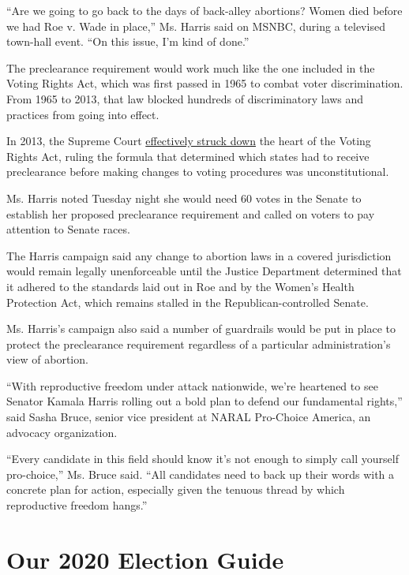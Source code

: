 ``Are we going to go back to the days of back-alley abortions? Women
died before we had Roe v. Wade in place,'' Ms. Harris said on MSNBC,
during a televised town-hall event. ``On this issue, I'm kind of done.''

The preclearance requirement would work much like the one included in
the Voting Rights Act, which was first passed in 1965 to combat voter
discrimination. From 1965 to 2013, that law blocked hundreds of
discriminatory laws and practices from going into effect.

In 2013, the Supreme Court
\href{https://www.nytimes3xbfgragh.onion/2013/06/26/us/supreme-court-ruling.html?module=inline}{effectively
struck down} the heart of the Voting Rights Act, ruling the formula that
determined which states had to receive preclearance before making
changes to voting procedures was unconstitutional.

Ms. Harris noted Tuesday night she would need 60 votes in the Senate to
establish her proposed preclearance requirement and called on voters to
pay attention to Senate races.

The Harris campaign said any change to abortion laws in a covered
jurisdiction would remain legally unenforceable until the Justice
Department determined that it adhered to the standards laid out in Roe
and by the Women's Health Protection Act, which remains stalled in the
Republican-controlled Senate.

Ms. Harris's campaign also said a number of guardrails would be put in
place to protect the preclearance requirement regardless of a particular
administration's view of abortion.

``With reproductive freedom under attack nationwide, we're heartened to
see Senator Kamala Harris rolling out a bold plan to defend our
fundamental rights,'' said Sasha Bruce, senior vice president at NARAL
Pro-Choice America, an advocacy organization.

``Every candidate in this field should know it's not enough to simply
call yourself pro-choice,'' Ms. Bruce said. ``All candidates need to
back up their words with a concrete plan for action, especially given
the tenuous thread by which reproductive freedom hangs.''

\hypertarget{our-2020-election-guide}{%
\section{Our 2020 Election Guide}\label{our-2020-election-guide}}

